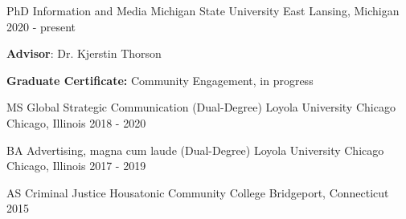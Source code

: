 

\begin{cventries}

  \cventry
    {PhD Information and Media} %
    {Michigan State University} %
    {East Lansing, Michigan} %
    {2020 - present} %
    {
      \begin{cvitems} %
              \item {\textbf{Advisor}: Dr. Kjerstin Thorson}
                \item {\textbf{Graduate Certificate:} Community Engagement, in progress}
      \end{cvitems}
    }

  \cventry
    {MS Global Strategic Communication (Dual-Degree)} %
    {Loyola University Chicago} %
    {Chicago, Illinois} %
    {2018 - 2020} %
    {
    }
    
\cventry
    {BA Advertising, magna cum laude (Dual-Degree)} %
    {Loyola University Chicago} %
    {Chicago, Illinois} %
    {2017 - 2019} %
    {
    }

  \cventry
    {AS Criminal Justice} %
    {Housatonic Community College} %
    {Bridgeport, Connecticut} %
    {2015} %
{
    }
\end{cventries}
